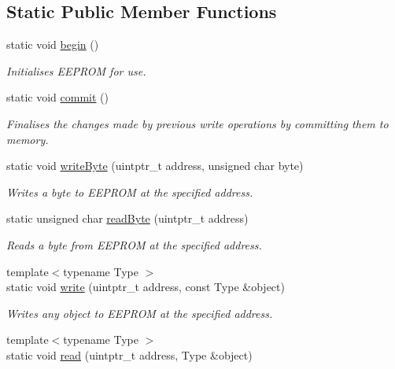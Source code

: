 \subsection*{Static Public Member Functions}
\begin{DoxyCompactItemize}
\item 
static void \mbox{\hyperlink{classArduboy2EEPROM_a4d482ef8e8204c56a0feba68791bc0c8}{begin}} ()
\begin{DoxyCompactList}\small\item\em Initialises E\+E\+P\+R\+OM for use. \end{DoxyCompactList}\item 
static void \mbox{\hyperlink{classArduboy2EEPROM_a3804f82ad79284baa047fa3572ea1db5}{commit}} ()
\begin{DoxyCompactList}\small\item\em Finalises the changes made by previous write operations by committing them to memory. \end{DoxyCompactList}\item 
static void \mbox{\hyperlink{classArduboy2EEPROM_a104991fb0112413980ee163aaa14d891}{write\+Byte}} (uintptr\+\_\+t address, unsigned char byte)
\begin{DoxyCompactList}\small\item\em Writes a byte to E\+E\+P\+R\+OM at the specified address. \end{DoxyCompactList}\item 
static unsigned char \mbox{\hyperlink{classArduboy2EEPROM_aec3f9eea5f4adc592da921df2ae7ba2d}{read\+Byte}} (uintptr\+\_\+t address)
\begin{DoxyCompactList}\small\item\em Reads a byte from E\+E\+P\+R\+OM at the specified address. \end{DoxyCompactList}\item 
{\footnotesize template$<$typename Type $>$ }\\static void \mbox{\hyperlink{classArduboy2EEPROM_abf7be1f27f4815de59257210dac8c9eb}{write}} (uintptr\+\_\+t address, const Type \&object)
\begin{DoxyCompactList}\small\item\em Writes any object to E\+E\+P\+R\+OM at the specified address. \end{DoxyCompactList}\item 
{\footnotesize template$<$typename Type $>$ }\\static void \mbox{\hyperlink{classArduboy2EEPROM_a6e9b09f0b94295c040204ca0cb674649}{read}} (uintptr\+\_\+t address, Type \&object)

\end{DoxyCompactItemize}
